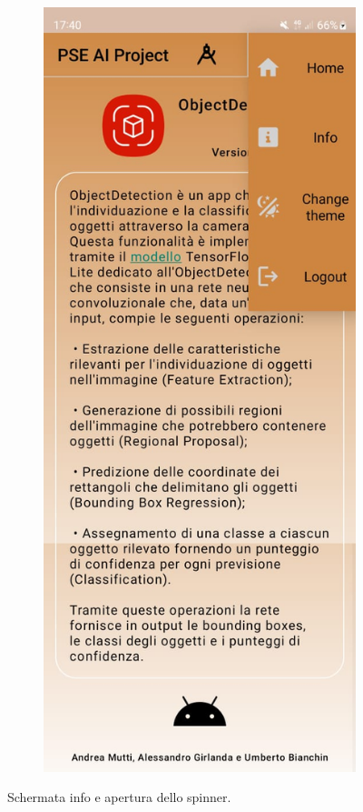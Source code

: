 \begin{figure}[ht]
\begin{subfigure}[b]{0.3\textwidth}
    \end{subfigure}
    \begin{subfigure}[b]{0.3\textwidth}
      \includegraphics[width=\textwidth, height=0.45\textheight]{Immagini/App/info_spinner_chiaro.jpeg}
    \end{subfigure}
    \caption{Schermata info e apertura dello spinner.}
    \label{fig:info}
\end{figure}

